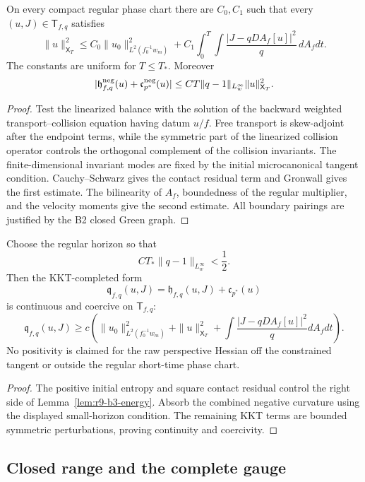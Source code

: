 \begin{lemma}
\label{lem:r9-b3-energy}
On every compact regular phase chart there are $C_0,C_1$ such that every
$(u,J)\in\mathsf T_{f,q}$ satisfies
\[
 \|u\|_{\mathsf X_T}^2
 \le C_0\|u_0\|_{L^2(f_0^{-1}w_m)}^2
 +C_1\int_0^T\!\int
 \frac{|J-qDA_f[u]|^2}{q}\,dA_fdt.
\]
The constants are uniform for $T\le T_*$.  Moreover
\[
 |\mathfrak h_{f,q}^{\rm neg}(u)+\mathfrak c_{p^*}^{\rm neg}(u)|
 \le CT\|q-1\|_{L^\infty_w}\|u\|_{\mathsf X_T}^2.
\]
\end{lemma}

\begin{proof}
Test the linearized balance with the solution of the backward weighted
transport--collision equation having datum $u/f$.  Free transport is
skew-adjoint after the endpoint terms, while the symmetric part of the
linearized collision operator controls the orthogonal complement of the
collision invariants.  The finite-dimensional invariant modes are fixed by
the initial microcanonical tangent condition.  Cauchy--Schwarz gives the
contact residual term and Gronwall gives the first estimate.  The bilinearity
of $A_f$, boundedness of the regular multiplier, and the velocity moments give
the second estimate.  All boundary pairings are justified by the B2 closed
Green graph.
\end{proof}

\begin{theorem}
\label{thm:r9-b3-curvature}
Choose the regular horizon so that
\[
 CT_*\|q-1\|_{L^\infty_w}<\frac12.
\]
Then the KKT-completed form
\[
 \mathfrak q_{f,q}(u,J)
 =\mathfrak h_{f,q}(u,J)+\mathfrak c_{p^*}(u)
\]
is continuous and coercive on $\mathsf T_{f,q}$:
\[
 \mathfrak q_{f,q}(u,J)
 \ge c\left(
  \|u_0\|_{L^2(f_0^{-1}w_m)}^2+
  \|u\|_{\mathsf X_T}^2+
  \int\frac{|J-qDA_f[u]|^2}{q}dA_fdt
 \right).
\]
No positivity is claimed for the raw perspective Hessian off the constrained
tangent or outside the regular short-time phase chart.
\end{theorem}

\begin{proof}
The positive initial entropy and square contact residual control the right
side of Lemma~\ref{lem:r9-b3-energy}.  Absorb the combined negative curvature
using the displayed small-horizon condition.  The remaining KKT terms are
bounded symmetric perturbations, proving continuity and coercivity.
\end{proof}

\subsection{Closed range and the complete gauge}

